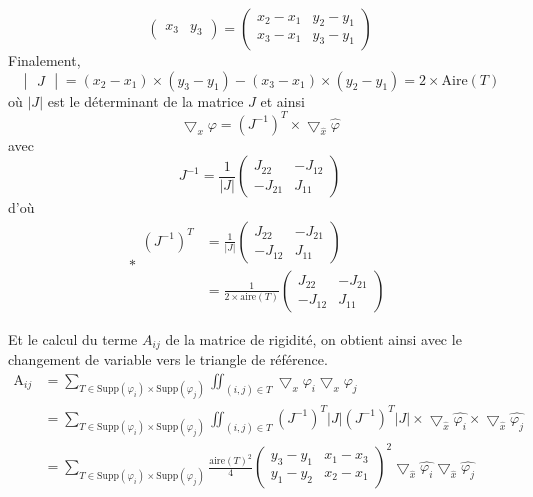 \documentclass[a4paper,12pt,titlepage]{report}
\begin{document}
\begin{onehalfspace}
\begin{appendix}
\[\begin{pmatrix}
   x_{3} &  y_{3}
\end{pmatrix} =
\begin{pmatrix}
   x_{2}-x_{1} &  y_{2}-y_{1} \\
   x_{3}-x_{1} &  y_{3}-y_{1}
\end{pmatrix}
\]
Finalement,
\[
\begin{vmatrix}
   J
\end{vmatrix}
= (x_{2}-x_{1})\times (y_{3}-y_{1})-(x_{3}-x_{1})\times(y_{2}-y_{1})= 2\times\text{Aire}(T)
\]
où $|J|$ est le déterminant de la matrice $J$
et ainsi
\[ \bigtriangledown_{x} \varphi =  (J^{-1})^{T} \times \bigtriangledown_{\hat{x}} \hat{\varphi} \]
avec
\[
J^{-1} =  \frac{1}{|J|}
\begin{pmatrix}
   J_{22} & -J_{12} \\
   -J_{21} & J_{11}
\end{pmatrix}
\]
d'où
\[
*\begin{aligned}
	(J^{-1})^{T} 
	&=  	
	\frac{1}{|J|}
	\begin{pmatrix}
   		J_{22} & -J_{21} \\
   		-J_{12} & J_{11}	
	\end{pmatrix} \\
	&=
	\frac{1}{2\times \text{aire}(T)}
	\begin{pmatrix}
   		J_{22} & -J_{21} \\
   		-J_{12} & J_{11}	
	\end{pmatrix} 
	\end{aligned}
\]

Et le calcul du terme $A_{ij}$ de la matrice de rigidité, on obtient ainsi avec le changement de variable vers le triangle de référence.
\[
\begin{aligned}
	\text{A}_{ij} 
	&=
	\sum_{T \in \text{Supp}(\varphi_{i})\times \text{Supp}(\varphi_{j})} 
	\iint_{(i,j) \in T}\bigtriangledown_{x}{\varphi_{i}} \bigtriangledown_{x}{\varphi_{j}} \\
	&=
	\sum_{T \in \text{Supp}(\varphi_{i})\times \text{Supp}(\varphi_{j})}
	\iint_{(i,j) \in T} (J^{-1})^{T}|J|(J^{-1})^{T}|J|
	\times
	\bigtriangledown_{\hat{x}} \hat{\varphi_{i}}
	\times
	\bigtriangledown_{\hat{x}} \hat{\varphi_{j}} \\
	&=
	\sum_{T \in \text{Supp}(\varphi_{i})\times \text{Supp}(\varphi_{j})}	
	\frac{\text{aire}(T)^{2}}{4}
	\begin{pmatrix}
   		y_{3}-y_{1} &  	x_{1}-x_{3}\\
   		y_{1}-y_{2} &  x_{2}-x_{1}
	\end{pmatrix}
	^{2}
	\bigtriangledown_{\hat{x}} \hat{\varphi_{i}}
	\bigtriangledown_{\hat{x}} \hat{\varphi_{j}}
\end{aligned}
\]


\end{appendix}
\end{onehalfspace}
\end{document}
